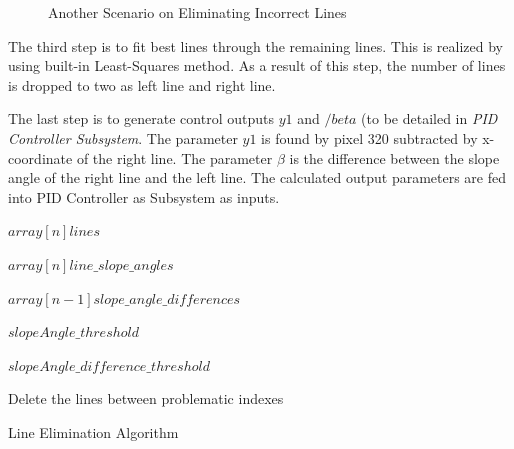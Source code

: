 \documentclass[a4paper,12pt]{article}
\begin{document}
\begin{enumerate}[A.]
\begin{figure}[t!]
\caption{\label{fig:dataP_explainedBroken} Another Scenario on Eliminating Incorrect Lines}

\end{figure}

The third step is to fit best lines through the remaining lines. This is realized by using built-in Least-Squares method. As a result of this step, the number of lines is dropped to two as left line and right line.


The last step is to generate control outputs $y1$ and $/beta$ (to be detailed in \textit{PID Controller Subsystem}. The parameter $y1$ is found by pixel 320 subtracted by x-coordinate of the right line. The parameter $\beta$ is the difference between the slope angle of the right line and the left line. The calculated output parameters are fed into PID Controller as Subsystem as inputs.

\begin{algorithm}[t]
	
	
	
	\DontPrintSemicolon
	
	
	$array[n] lines $\;
	
	$array[n] line\_slope\_angles $\;
	
	$array[n-1] slope\_angle\_differences$ \;
	
	
	$slopeAngle\_threshold $\;
	
	$slopeAngle\_difference\_threshold$ \;
	
	
	
	
	Delete the lines between problematic indexes 
	
	\caption{Line Elimination Algorithm}
	

\end{algorithm}
\end{enumerate}
\end{document}
